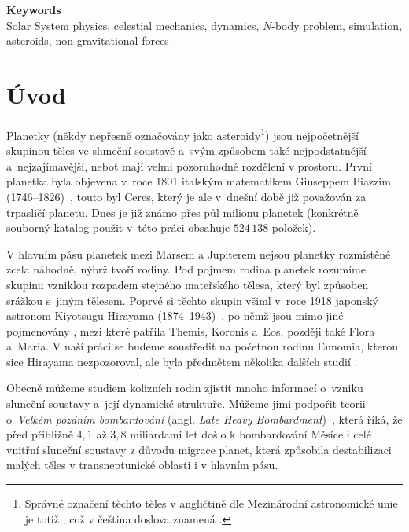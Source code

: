 \documentclass[A4paper, 12pt, oneside]{book}
\begin{document}
{\large \bfseries Keywords}\\
Solar System physics, celestial mechanics, dynamics, $N$-body problem, simulation, asteroids, non-gravitational forces

\newpage

\tableofcontents

\newpage
\pagestyle{headings} %
\chapter*{Úvod} \label{ch:uvod} 
Planetky (někdy nepřesně označovány jako asteroidy\footnote{Správné označení těchto těles v angličtině dle Mezinárodní astronomické unie je totiž , což v čeština doslova znamená .}) jsou nejpočetnější skupinou těles ve sluneční soustavě a~svým způsobem také nejpodstatnější a~nejzajímavější, neboť mají velmi pozoruhodné rozdělení v prostoru. První planetka byla objevena v~roce 1801 italským matematikem Giuseppem Piazzim (1746--1826)~\cite{wiki:piazzi}, touto  byl Ceres, který je ale v~dnešní době již považován za trpasličí planetu. Dnes je již známo přes půl milionu planetek (konkrétně souborný katalog použit v~této práci \cite{astorb}\cite{knezevic12}\cite{nugent15}\cite{usui11}\cite{ivezic01} obsahuje $524\,138$ položek).

V hlavním pásu planetek mezi Marsem a Jupiterem nejsou planetky rozmístěné zcela náhodně, nýbrž tvoří rodiny. Pod pojmem rodina planetek rozumíme skupinu vzniklou rozpadem stejného mateřského tělesa, který byl způsoben srážkou s~jiným tělesem. Poprvé si těchto skupin všiml v~roce 1918 japonský astronom Kiyotsugu Hirayama (1874--1943)~\cite{wiki:hirayama}, po němž jsou mimo jiné pojmenovány , mezi které patřila Themis, Koronis a~Eos, později také Flora a~Maria. V naší práci se budeme soustředit na početnou rodinu Eunomia, kterou sice Hirayama nezpozoroval, ale byla předmětem několika dalších studií \cite{nesvorny15} \cite{carruba16}.

Obecně můžeme studiem kolizních rodin zjistit mnoho informací o~vzniku sluneční soustavy a~její dynamické struktuře. Můžeme jimi podpořit teorii o~\textit{Velkém pozdním bombardování} (angl. \textit{Late Heavy Bombardment})~\cite{broz13}, která říká, že před přibližně $4,1$ až $3,8$ miliardami let došlo k bombardování Měsíce i celé vnitřní sluneční soustavy z důvodu migrace planet, která způsobila destabilizaci malých těles v transneptunické oblasti i v hlavním pásu.
\end{document}
